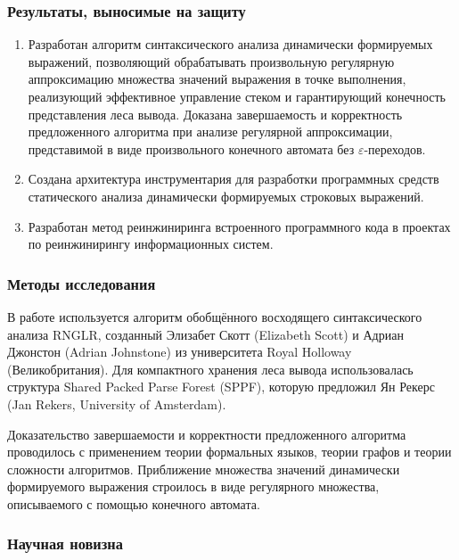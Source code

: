\subsubsection*{\large{Результаты, выносимые на защиту}}
\begin{enumerate}
    \item Разработан алгоритм синтаксического анализа динамически формируемых выражений, позволяющий обрабатывать произвольную регулярную аппроксимацию множества значений выражения в точке выполнения, реализующий 
    эффективное управление стеком и гарантирующий конечность представления леса вывода. Доказана завершаемость и корректность предложенного алгоритма при анализе регулярной аппроксимации, представимой в виде произвольного конечного автомата без $\varepsilon$-переходов. 
    \item Создана архитектура инструментария для разработки программных средств статического анализа динамически формируемых строковых выражений.
    \item Разработан метод реинжиниринга встроенного программного кода в проектах по реинжинирингу информационных систем. 
\end{enumerate}

\subsubsection*{\large{Методы исследования}}

В работе используется алгоритм обобщённого восходящего синтаксического анализа RNGLR, созданный Элизабет Скотт (Elizabeth Scott) и Адриан Джонстон (Adrian Johnstone) из университета Royal Holloway (Великобритания). Для компактного хранения леса вывода использовалась структура Shared Packed Parse Forest (SPPF), которую предложил Ян Рекерс (Jan Rekers, University of Amsterdam).

Доказательство завершаемости и корректности предложенного алгоритма проводилось с применением теории формальных языков, теории графов и теории сложности алгоритмов. Приближение множества значений динамически формируемого выражения строилось в виде регулярного множества, описываемого с помощью конечного автомата.

\subsubsection*{\large{Научная новизна}}

